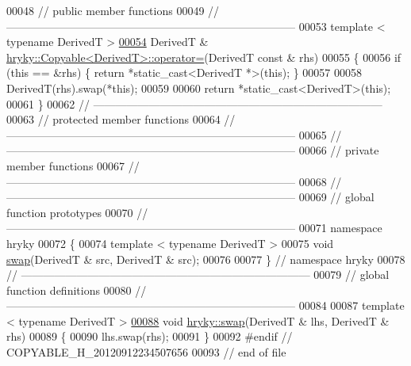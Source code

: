 \begin{DoxyCode}
00048 \textcolor{comment}{// public member functions}
00049 \textcolor{comment}{//
      ------------------------------------------------------------------------------}
00053 \textcolor{comment}{}\textcolor{keyword}{template} < \textcolor{keyword}{typename} DerivedT >
\hypertarget{copyable_8h_source_l00054}{}\hyperlink{classhryky_1_1_copyable_a8ba34166fbf522863d3318e820d18212}{00054} DerivedT & \hyperlink{classhryky_1_1_copyable_a8ba34166fbf522863d3318e820d18212}{hryky::Copyable<DerivedT>::operator=}(DerivedT \textcolor{keyword}{const} & rhs)
00055 \{
00056     \textcolor{keywordflow}{if} (\textcolor{keyword}{this} == &rhs) \{ \textcolor{keywordflow}{return} *\textcolor{keyword}{static\_cast<}DerivedT *\textcolor{keyword}{>}(\textcolor{keyword}{this}); \}
00057 
00058     DerivedT(rhs).swap(*\textcolor{keyword}{this});
00059 
00060     \textcolor{keywordflow}{return} *\textcolor{keyword}{static\_cast<}DerivedT\textcolor{keyword}{>}(\textcolor{keyword}{this});
00061 \}
00062 \textcolor{comment}{//
      ------------------------------------------------------------------------------}
00063 \textcolor{comment}{// protected member functions}
00064 \textcolor{comment}{//
      ------------------------------------------------------------------------------}
00065 \textcolor{comment}{//
      ------------------------------------------------------------------------------}
00066 \textcolor{comment}{// private member functions}
00067 \textcolor{comment}{//
      ------------------------------------------------------------------------------}
00068 \textcolor{comment}{//
      ------------------------------------------------------------------------------}
00069 \textcolor{comment}{// global function prototypes}
00070 \textcolor{comment}{//
      ------------------------------------------------------------------------------}
00071 \textcolor{keyword}{namespace }hryky
00072 \{
00074     \textcolor{keyword}{template} < \textcolor{keyword}{typename} DerivedT >
00075     \textcolor{keywordtype}{void} \hyperlink{namespacehryky_a4282146df5ea2b68cb667896a2205909}{swap}(DerivedT & src, DerivedT & src);
00076 
00077 \} \textcolor{comment}{// namespace hryky}
00078 \textcolor{comment}{//
      ------------------------------------------------------------------------------}
00079 \textcolor{comment}{// global function definitions}
00080 \textcolor{comment}{//
      ------------------------------------------------------------------------------}
00084 \textcolor{comment}{}
00087 \textcolor{comment}{}\textcolor{keyword}{template} < \textcolor{keyword}{typename} DerivedT >
\hypertarget{copyable_8h_source_l00088}{}\hyperlink{namespacehryky_a39d9ffc629490589a9941a892b7073c8}{00088} \textcolor{keywordtype}{void} \hyperlink{namespacehryky_a4282146df5ea2b68cb667896a2205909}{hryky::swap}(DerivedT & lhs, DerivedT & rhs)
00089 \{
00090     lhs.swap(rhs);
00091 \}
00092 \textcolor{preprocessor}{#endif // COPYABLE\_H\_20120912234507656}
00093 \textcolor{preprocessor}{}\textcolor{comment}{// end of file}
\end{DoxyCode}

